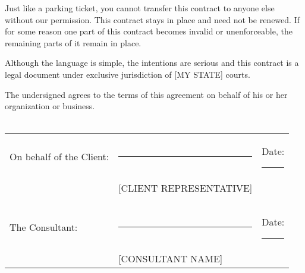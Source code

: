 \documentclass[10pt,a4paper,parskip]{scrartcl}
\begin{document}
Just like a parking ticket, you cannot transfer this contract to anyone else
without our permission. This contract stays in place and need not be renewed.
If for some reason one part of this contract becomes invalid or unenforceable,
the remaining parts of it remain in place.

Although the language is simple, the intentions are serious and this contract
is a legal document under exclusive jurisdiction of [MY STATE] courts.


\vspace{1cm}

\noindent The undersigned agrees to the terms of this agreement on behalf of
his or her organization or business.\\\\

\noindent \begin{tabular}{l l l}
On behalf of the Client: & \rule{6cm}{.2pt}        & Date: \rule{2.4cm}{.2pt}\\
                         & [CLIENT REPRESENTATIVE] & \\\\\\
The Consultant:          & \rule{6cm}{.2pt}        & Date: \rule{2.4cm}{.2pt}\\
                         & [CONSULTANT NAME]       & \\
\end{tabular}
\end{document}
